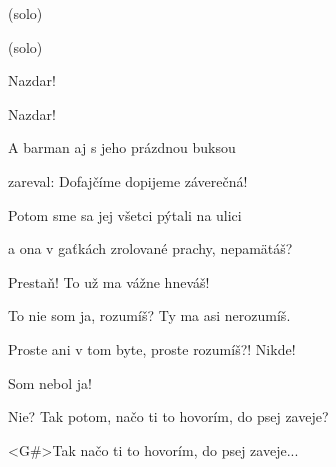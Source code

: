 \zs
(solo)
\ks

\zs
(solo)

Nazdar!

Nazdar!
\ks

\zs
A barman aj s jeho prázdnou buksou 

zareval: Dofajčíme dopijeme záverečná! 

Potom sme sa jej všetci pýtali na ulici 

a ona v gaťkách zrolované prachy, nepamätáš? 
\ks

\zs
Prestaň! To už ma vážne hneváš! 

To nie som ja, rozumíš? Ty ma asi nerozumíš. 

Proste ani v tom byte, proste rozumíš?! Nikde! 

Som nebol ja! 
\ks

Nie? Tak potom, načo ti to hovorím, do psej zaveje? 

\zr
<G#>Tak načo ti to hovorím, do psej zaveje...
\kr

\kp
